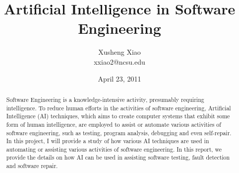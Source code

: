 \documentclass[times, 10pt,onecolumn]{article}
\title{Artificial Intelligence in Software Engineering}
\author{
Xusheng Xiao\\
\small{xxiao2@ncsu.edu}\\
}
\date{April 23, 2011}
\begin{document}
 
\maketitle
\thispagestyle{empty}
\pagestyle{empty}

\begin{abstract}
Software Engineering is a knowledge-intensive activity, presumably requiring intelligence. To reduce human efforts in the activities of software engineering, Artificial Intelligence (AI) techniques, which aims to create computer systems that exhibit some form of human intelligence, are employed to assist or automate various activities of software engineering, such as testing, program analysis, debugging and even self-repair. In this project, I will provide a study of how various AI techniques are used in automating or assisting various activities of software engineering. In this report, we provide the details on how AI can be used in assisting software testing, fault detection and software repair. 
\end{abstract}







% 



\end{document}
